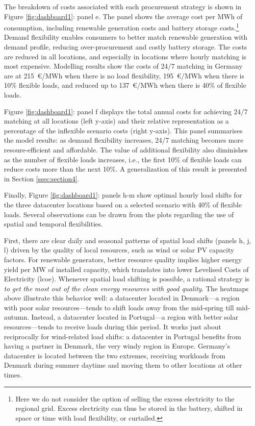 The breakdown of costs associated with each procurement strategy is shown in Figure \ref{fig:dashboard1}: panel e. The panel shows the average cost per MWh of consumption, including renewable generation costs and battery storage costs.\footnote{Here we do not consider the option of selling the excess electricity to the regional grid. Excess electricity can thus be stored in the battery, shifted in space or time with load flexibility, or curtailed.} Demand flexibility enables consumers to better match renewable generation with demand profile, reducing over-procurement and costly battery storage. The costs are reduced in all locations, and especially in locations where hourly matching is most expensive. Modelling results show the costs of 24/7 matching in Germany are at 215~\euro/MWh when there is no load flexibility, 195~\euro/MWh when there is 10\% flexible loads, and reduced up to 137~\euro/MWh when there is 40\% of flexible loads.

Figure \ref{fig:dashboard1}: panel f displays the total annual costs for achieving 24/7 matching at all locations (left y-axis) and their relative representation as a percentage of the inflexible scenario costs (right y-axis). This panel summarises the model results: as demand flexibility increases, 24/7 matching becomes more resoure-efficient and affordable. The value of additional flexibility also diminishes as the number of flexible loads increases, i.e., the first 10\% of flexible loads can reduce costs more than the next 10\%. A generalization of this result is presented in Section \ref{ssec:section4}.

Finally, Figure \ref{fig:dashboard1}: panels h-m show optimal hourly load shifts for the three datacenter locations based on a selected scenario with 40\% of flexible loads. Several observations can be drawn from the plots regarding the use of spatial and temporal flexibilities.

First, there are clear daily and seasonal patterns of spatial load shifts (panels h, j, l) driven by the quality of local resources, such as wind or solar PV capacity factors. For renewable generators, better resource quality implies higher energy yield per MW of installed capacity, which translates into lower Levelised Costs of Electricity (\gls{lcoe}). Whenever spatial load shifting is possible, a rational strategy is \textit{to get the most out of the clean energy resources with good quality}. The heatmaps above illustrate this behavior well: a datacenter located in Denmark---a region with poor solar resources---tends to shift loads away from the mid-spring till mid-autumn. Instead, a datacenter located in Portugal---a region with better solar resources---tends to receive loads during this period. It works just about reciprocally for wind-related load shifts: a datacenter in Portugal benefits from having a partner in Denmark, the very windy region in Europe.
Germany's datacenter is located between the two extremes, receiving workloads from Denmark during summer daytime and moving them to other locations at other times.


